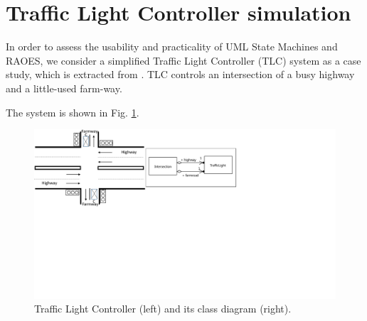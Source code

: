 \section{Traffic Light Controller simulation}
\label{sec:casestudy}
In order to assess the usability and practicality of UML State Machines and RAOES, we consider a simplified Traffic Light Controller (TLC) system as a case study, which is extracted from \cite{katz2005contemporary}.
TLC controls an intersection of a busy highway and a little-used farm-way.

The system is shown in Fig. \ref{fig:casestudy}.

\begin{figure}
	\centering
	\includegraphics[clip, trim=0.6cm 10.4cm 10.9cm 0cm, width=1.0\columnwidth]{figures/casestudy}
	\caption{Traffic Light Controller (left) and its class diagram (right).} 
	\label{fig:casestudy}
\end{figure}






